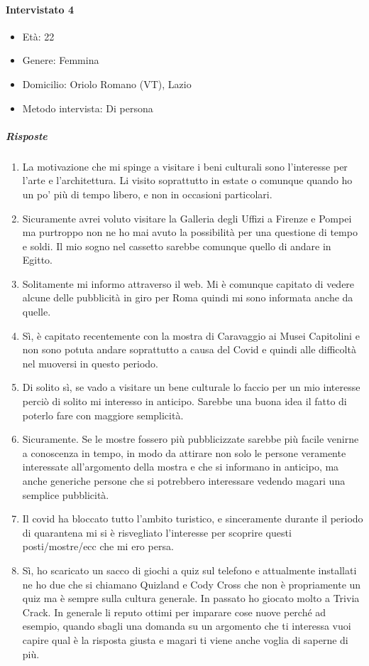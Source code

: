 \documentclass{article}
\begin{document}
\paragraph{Intervistato 4}
\begin{itemize}
\item Età: 22
\item Genere: Femmina
\item Domicilio: Oriolo Romano (VT), Lazio
\item Metodo intervista: Di persona
\end{itemize}
\subparagraph{Risposte}
\begin{enumerate}
\item La motivazione che mi spinge a visitare i beni culturali sono l’interesse per l’arte e l’architettura. Li visito soprattutto in estate o comunque quando ho un po’ più di tempo libero, e non in occasioni particolari.
\item Sicuramente avrei voluto visitare la Galleria degli Uffizi a Firenze e Pompei ma purtroppo non ne ho mai avuto la possibilità per una questione di tempo e soldi. Il mio sogno nel cassetto sarebbe comunque quello di andare in Egitto.
\item Solitamente mi informo attraverso il web. Mi è comunque capitato di vedere alcune delle pubblicità in giro per Roma quindi mi sono informata anche da quelle.
\item Sì, è capitato recentemente con la mostra di Caravaggio ai Musei Capitolini e non sono potuta andare soprattutto a causa del Covid e quindi alle difficoltà nel muoversi in questo periodo.
\item Di solito sì, se vado a visitare un bene culturale lo faccio per un mio interesse perciò di solito mi interesso in anticipo. Sarebbe una buona idea il fatto di poterlo fare con maggiore semplicità.
\item Sicuramente. Se le mostre fossero più pubblicizzate sarebbe più facile venirne a conoscenza in tempo, in modo da attirare non solo le persone veramente interessate all'argomento della mostra e che si informano in anticipo, ma anche generiche persone che si potrebbero interessare vedendo magari una semplice pubblicità.
\item Il covid ha bloccato tutto l'ambito turistico, e sinceramente durante il periodo di quarantena mi si è risvegliato l'interesse per scoprire questi posti/mostre/ecc che mi ero persa.
\item Sì, ho scaricato un sacco di giochi a quiz sul telefono e attualmente installati ne ho due che si chiamano Quizland e Cody Cross che non è propriamente un quiz ma è sempre sulla cultura generale. In passato ho giocato molto a Trivia Crack. In generale li reputo ottimi per imparare cose nuove perché ad esempio, quando sbagli una domanda su un argomento che ti interessa vuoi capire qual è la risposta giusta e magari ti viene anche voglia di saperne di più.

\end{enumerate}
\end{document}
